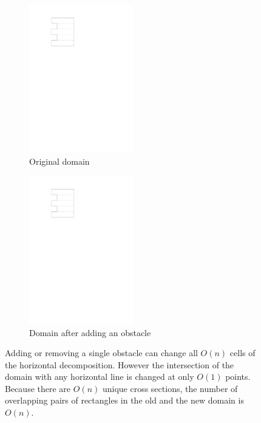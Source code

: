 \documentclass[english,gradu]{tktltiki2018}
\begin{document}
\begin{figure}\centering
	\begin{subfigure}[t]{0.45\textwidth}\centering
		\includegraphics[width=0.5\textwidth,page=1]{fig/linkproof}
		\caption{Original domain}
	\end{subfigure}
	\hfil
	\begin{subfigure}[t]{0.45\textwidth}\centering
		\includegraphics[width=0.5\textwidth,page=2]{fig/linkproof}
		\caption{Domain after adding an obstacle}
	\end{subfigure}
	\caption{Adding or removing a single obstacle can change all $O(n)$ cells of the horizontal decomposition.
	However the intersection of the domain with any horizontal line is changed at only $O(1)$ points.
	Because there are $O(n)$ unique cross sections, the number of overlapping pairs of rectangles in the old and the new domain is $O(n)$.}\label{fig:linkproof}
\end{figure}
\end{document}
